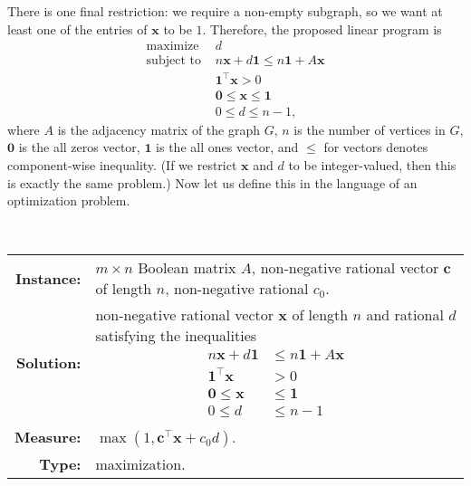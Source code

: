 \documentclass[]{article}
\begin{document}
There is one final restriction: we require a non-empty subgraph, so we want at least one of the entries of $\mathbf{x}$ to be $1$.
Therefore, the proposed linear program is
\begin{align*}
  \text{maximize } & d \\
  \text{subject to }
  & n \mathbf{x} + d \mathbf{1} \leq n \mathbf{1} + A \mathbf{x} \\
  & \mathbf{1}^\intercal \mathbf{x} > 0 \\
  & \mathbf{0} \leq \mathbf{x} \leq \mathbf{1} \\
  & 0 \leq d \leq n - 1,
\end{align*}
where $A$ is the adjacency matrix of the graph $G$, $n$ is the number of vertices in $G$, $\mathbf{0}$ is the all zeros vector, $\mathbf{1}$ is the all ones vector, and $\leq$ for vectors denotes component-wise inequality.
(If we restrict $\mathbf{x}$ and $d$ to be integer-valued, then this is exactly the same problem.)
Now let us define this in the language of an optimization problem.
\begin{definition}
  \mbox{} \\
  \begin{tabular}{r p{9.5cm}}
    \textbf{Instance:} & $m \times n$ Boolean matrix $A$, non-negative rational vector $\mathbf{c}$ of length $n$, non-negative rational $c_0$. \\
    \textbf{Solution:} & non-negative rational vector $\mathbf{x}$ of length $n$ and rational $d$ satisfying the inequalities
           {
             \begin{align*}
               n \mathbf{x} + d \mathbf{1} & \leq n \mathbf{1} + A \mathbf{x} \\
               \mathbf{1}^\intercal \mathbf{x} & > 0 \\
               \mathbf{0} \leq \mathbf{x} & \leq \mathbf{1} \\
               0 \leq d & \leq n - 1
             \end{align*}
           } \\[-1em]
    \textbf{Measure:} & $\max(1, \mathbf{c}^\intercal \mathbf{x} + c_0 d)$. \\
    \textbf{Type:} & maximization.
  \end{tabular}
\end{definition}
\end{document}
